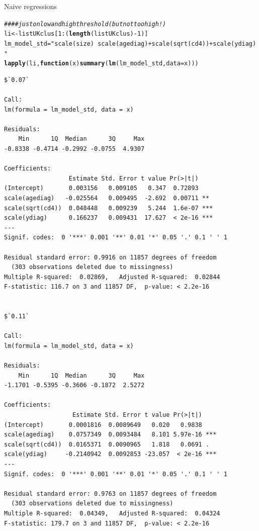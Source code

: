 \documentclass[]{revtex4}\usepackage[]{graphicx}\usepackage[]{color}
\makeatletter
\newcommand{\hlnum}[1]{\textcolor[rgb]{0.686,0.059,0.569}{#1}}%
\newcommand{\hlstr}[1]{\textcolor[rgb]{0.192,0.494,0.8}{#1}}%
\newcommand{\hlcom}[1]{\textcolor[rgb]{0.678,0.584,0.686}{\textit{#1}}}%
\newcommand{\hlopt}[1]{\textcolor[rgb]{0,0,0}{#1}}%
\newcommand{\hlstd}[1]{\textcolor[rgb]{0.345,0.345,0.345}{#1}}%
\newcommand{\hlkwa}[1]{\textcolor[rgb]{0.161,0.373,0.58}{\textbf{#1}}}%
\newcommand{\hlkwb}[1]{\textcolor[rgb]{0.69,0.353,0.396}{#1}}%
\newcommand{\hlkwc}[1]{\textcolor[rgb]{0.333,0.667,0.333}{#1}}%
\newcommand{\hlkwd}[1]{\textcolor[rgb]{0.737,0.353,0.396}{\textbf{#1}}}%
\newenvironment{kframe}{%
 \def\at@end@of@kframe{}%
 \ifinner\ifhmode%
  \def\at@end@of@kframe{\end{minipage}}%
  \begin{minipage}{\columnwidth}%
 \fi\fi%
 \def\FrameCommand##1{\hskip\@totalleftmargin \hskip-\fboxsep
 \colorbox{shadecolor}{##1}\hskip-\fboxsep
     \hskip-\linewidth \hskip-\@totalleftmargin \hskip\columnwidth}%
 \MakeFramed {\advance\hsize-\width
   \@totalleftmargin\z@ \linewidth\hsize
   \@setminipage}}%
 {\par\unskip\endMakeFramed%
 \at@end@of@kframe}
\newenvironment{knitrout}{}{} %
\makeatother
\begin{document}
Naive regressions
\begin{knitrout}
\color{fgcolor}\begin{kframe}
\begin{alltt}
\hlcom{#### just on low and high threshold (but not too high !)}
\hlstd{li} \hlkwb{<-} \hlstd{listUKclus[} \hlnum{1}\hlopt{:}\hlstd{(}\hlkwd{length}\hlstd{(listUKclus)}\hlopt{-}\hlnum{1}\hlstd{) ]}
\hlstd{lm_model_std} \hlkwb{=} \hlstr{"scale(size) ~ scale(agediag) + scale(sqrt(cd4)) +  scale(ydiag)"}
\hlkwd{lapply}\hlstd{(li,} \hlkwa{function}\hlstd{(}\hlkwc{x}\hlstd{)} \hlkwd{summary}\hlstd{(}\hlkwd{lm}\hlstd{(lm_model_std,} \hlkwc{data} \hlstd{= x)))}
\end{alltt}
\begin{verbatim}
$`0.07`

Call:
lm(formula = lm_model_std, data = x)

Residuals:
    Min      1Q  Median      3Q     Max 
-0.8338 -0.4714 -0.2992 -0.0755  4.9307 

Coefficients:
                  Estimate Std. Error t value Pr(>|t|)    
(Intercept)       0.003156   0.009105   0.347  0.72893    
scale(agediag)   -0.025564   0.009495  -2.692  0.00711 ** 
scale(sqrt(cd4))  0.048448   0.009239   5.244  1.6e-07 ***
scale(ydiag)      0.166237   0.009431  17.627  < 2e-16 ***
---
Signif. codes:  0 '***' 0.001 '**' 0.01 '*' 0.05 '.' 0.1 ' ' 1

Residual standard error: 0.9916 on 11857 degrees of freedom
  (303 observations deleted due to missingness)
Multiple R-squared:  0.02869,	Adjusted R-squared:  0.02844 
F-statistic: 116.7 on 3 and 11857 DF,  p-value: < 2.2e-16


$`0.11`

Call:
lm(formula = lm_model_std, data = x)

Residuals:
    Min      1Q  Median      3Q     Max 
-1.1701 -0.5395 -0.3606 -0.1872  2.5272 

Coefficients:
                   Estimate Std. Error t value Pr(>|t|)    
(Intercept)       0.0001816  0.0089649   0.020   0.9838    
scale(agediag)    0.0757349  0.0093484   8.101 5.97e-16 ***
scale(sqrt(cd4))  0.0165371  0.0090965   1.818   0.0691 .  
scale(ydiag)     -0.2140942  0.0092853 -23.057  < 2e-16 ***
---
Signif. codes:  0 '***' 0.001 '**' 0.01 '*' 0.05 '.' 0.1 ' ' 1

Residual standard error: 0.9763 on 11857 degrees of freedom
  (303 observations deleted due to missingness)
Multiple R-squared:  0.04349,	Adjusted R-squared:  0.04324 
F-statistic: 179.7 on 3 and 11857 DF,  p-value: < 2.2e-16
\end{verbatim}
\end{kframe}
\end{knitrout}
\end{document}
